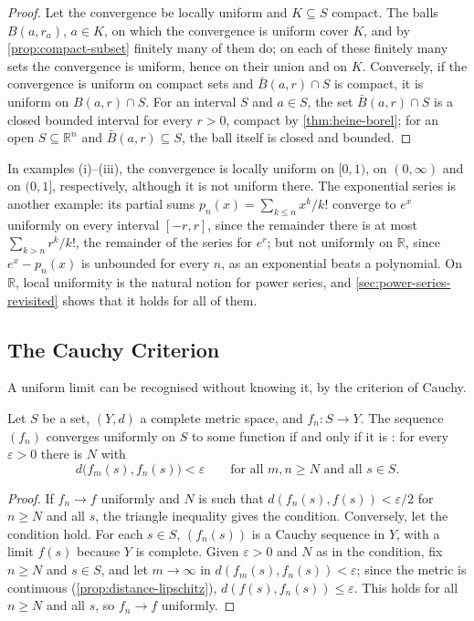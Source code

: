 \begin{proof}
Let the convergence be locally uniform and $K\subseteq S$ compact. The balls $B(a,r_a)$, $a\in K$, on which the convergence is uniform cover $K$, and by \cref{prop:compact-subset} finitely many of them do; on each of these finitely many sets the convergence is uniform, hence on their union and on $K$. Conversely, if the convergence is uniform on compact sets and $\bar B(a,r)\cap S$ is compact, it is uniform on $B(a,r)\cap S$. For an interval $S$ and $a\in S$, the set $\bar B(a,r)\cap S$ is a closed bounded interval for every $r>0$, compact by \cref{thm:heine-borel}; for an open $S\subseteq\mathbb R^n$ and $\bar B(a,r)\subseteq S$, the ball itself is closed and bounded.
\end{proof}

In examples (i)--(iii), the convergence is locally uniform on $[0,1)$, on $(0,\infty)$ and on $(0,1]$, respectively, although it is not uniform there. The exponential series is another example: its partial sums $p_n(x)=\sum_{k\le n}x^k/k!$ converge to $e^x$ uniformly on every interval $[-r,r]$, since the remainder there is at most $\sum_{k>n}r^k/k!$, the remainder of the series for $e^r$; but not uniformly on $\mathbb R$, since $e^x-p_n(x)$ is unbounded for every $n$, as an exponential beats a polynomial. On $\mathbb R$, local uniformity is the natural notion for power series, and \cref{sec:power-series-revisited} shows that it holds for all of them.

\subsection{The Cauchy Criterion}

A uniform limit can be recognised without knowing it, by the criterion of Cauchy.

\begin{theorem}
\label{thm:uniform-cauchy}
Let $S$ be a set, $(Y,d)$ a complete metric space, and $f_n\colon S\to Y$. The sequence $(f_n)$ converges uniformly on $S$ to some function if and only if it is : for every $\varepsilon>0$ there is $N$ with
\[
d\bigl(f_m(s),f_n(s)\bigr)<\varepsilon\qquad\text{for all }m,n\ge N\text{ and all }s\in S .
\]
\end{theorem}

\begin{proof}
If $f_n\to f$ uniformly and $N$ is such that $d(f_n(s),f(s))<\varepsilon/2$ for $n\ge N$ and all $s$, the triangle inequality gives the condition. Conversely, let the condition hold. For each $s\in S$, $(f_n(s))$ is a Cauchy sequence in $Y$, with a limit $f(s)$ because $Y$ is complete. Given $\varepsilon>0$ and $N$ as in the condition, fix $n\ge N$ and $s\in S$, and let $m\to\infty$ in $d(f_m(s),f_n(s))<\varepsilon$; since the metric is continuous (\cref{prop:distance-lipschitz}), $d(f(s),f_n(s))\le\varepsilon$. This holds for all $n\ge N$ and all $s$, so $f_n\to f$ uniformly.
\end{proof}

